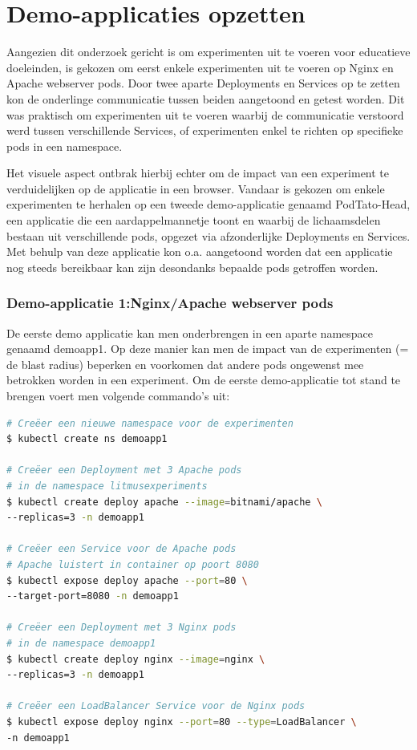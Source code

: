 \section{Demo-applicaties opzetten}

 Aangezien dit onderzoek gericht is om experimenten uit te voeren voor educatieve doeleinden, is gekozen om eerst enkele experimenten uit te voeren op Nginx en Apache webserver pods. Door twee aparte Deployments en Services op te zetten kon de onderlinge communicatie tussen beiden aangetoond en getest worden. Dit was praktisch om experimenten uit te voeren waarbij de communicatie verstoord werd tussen verschillende Services, of experimenten enkel te richten op specifieke pods in een namespace. 

Het visuele aspect ontbrak hierbij echter om de impact van een experiment te verduidelijken op de applicatie in een browser. Vandaar is gekozen om enkele experimenten te herhalen op een tweede demo-applicatie genaamd PodTato-Head, een applicatie die een aardappelmannetje toont en waarbij de lichaamsdelen bestaan uit verschillende pods, opgezet via afzonderlijke Deployments en Services.   Met behulp van deze applicatie kon o.a. aangetoond worden dat een applicatie nog steeds bereikbaar kan zijn desondanks bepaalde pods getroffen worden.

\subsubsection{Demo-applicatie 1:Nginx/Apache webserver pods}

De eerste demo applicatie kan men onderbrengen in een aparte namespace genaamd demoapp1. Op deze manier kan men de impact van de experimenten (= de blast radius) beperken en voorkomen dat andere pods ongewenst mee betrokken worden in een experiment. Om de eerste demo-applicatie tot stand te brengen voert men volgende commando's uit: 
\begin{lstlisting}[language=bash]
# Creëer een nieuwe namespace voor de experimenten
$ kubectl create ns demoapp1

# Creëer een Deployment met 3 Apache pods
# in de namespace litmusexperiments
$ kubectl create deploy apache --image=bitnami/apache \
--replicas=3 -n demoapp1

# Creëer een Service voor de Apache pods
# Apache luistert in container op poort 8080
$ kubectl expose deploy apache --port=80 \
--target-port=8080 -n demoapp1

# Creëer een Deployment met 3 Nginx pods 
# in de namespace demoapp1
$ kubectl create deploy nginx --image=nginx \
--replicas=3 -n demoapp1

# Creëer een LoadBalancer Service voor de Nginx pods
$ kubectl expose deploy nginx --port=80 --type=LoadBalancer \
-n demoapp1
\end{lstlisting} 

